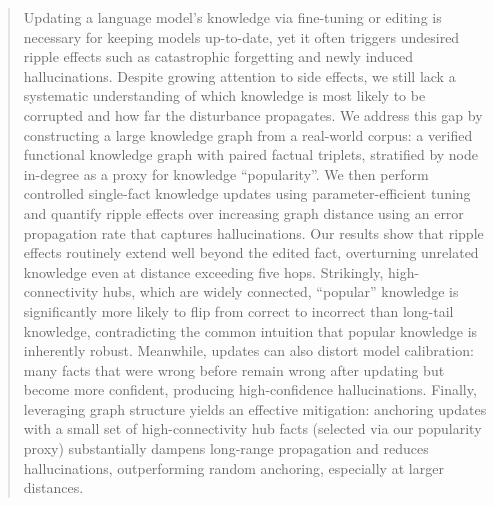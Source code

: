 \begin{abstract}
Updating a language model’s knowledge via fine-tuning or editing is necessary for keeping models up-to-date, yet it often triggers undesired ripple effects such as catastrophic forgetting 
and newly induced hallucinations.  Despite growing attention to side effects, we still lack a systematic understanding of which knowledge is most likely to be corrupted and how far the disturbance propagates. We address this gap by constructing a large knowledge graph 
from a real-world corpus: a verified functional knowledge graph with paired factual
triplets, stratified by node in-degree as a proxy for knowledge ``popularity''. We then perform controlled single-fact knowledge updates using parameter-efficient tuning and quantify ripple effects over increasing graph distance using an error propagation rate that captures hallucinations.
Our results show that ripple effects routinely extend well beyond the edited fact, overturning unrelated knowledge even at distance exceeding five hops. Strikingly, high-connectivity hubs, which are widely connected, ``popular'' knowledge is significantly more likely to flip from correct to incorrect than long-tail knowledge, contradicting the common intuition that popular knowledge is inherently robust. Meanwhile, updates can also distort model calibration: many facts that were wrong before remain wrong after updating but become more confident, producing high-confidence hallucinations. Finally, leveraging graph structure yields an effective mitigation: anchoring updates with a small set of high-connectivity hub facts  (selected via our popularity proxy) substantially dampens long-range propagation and reduces hallucinations, outperforming random anchoring, especially at larger distances. 


\end{abstract}
